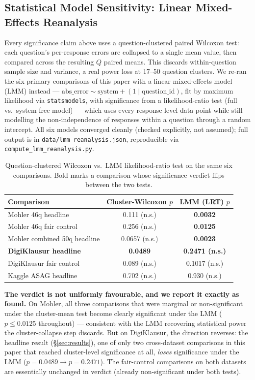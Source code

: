 \documentclass[conference]{IEEEtran}
\begin{document}
\subsection{Statistical Model Sensitivity: Linear Mixed-Effects Reanalysis}
\label{subsec:lmm}

Every significance claim above uses a question-clustered paired Wilcoxon
test: each question's per-response errors are collapsed to a single mean
value, then compared across the resulting $Q$ paired means. This discards
within-question sample size and variance, a real power loss at
$17$--$50$ question clusters. We re-ran the six primary comparisons of this
paper with a linear mixed-effects model (LMM) instead --- $\mathrm{abs\_error}
\sim \mathrm{system} + (1 \mid \mathrm{question\_id})$, fit by maximum
likelihood via \texttt{statsmodels}, with significance from a likelihood-ratio
test (full vs.\ system-free model) --- which uses every response-level data
point while still modelling the non-independence of responses within a
question through a random intercept. All six models converged cleanly
(checked explicitly, not assumed); full output is in
\texttt{data/lmm\_reanalysis.json}, reproducible via
\texttt{compute\_lmm\_reanalysis.py}.

\begin{table}[t]
\centering
\caption{Question-clustered Wilcoxon vs.\ LMM likelihood-ratio test on the
same six comparisons. Bold marks a comparison whose significance verdict
flips between the two tests.}
\label{tab:lmm}
\small
\begin{tabular}{lcc}
\toprule
\textbf{Comparison} & \textbf{Cluster-Wilcoxon $p$} & \textbf{LMM (LRT) $p$} \\
\midrule
Mohler 46q headline & 0.111 (n.s.) & \textbf{0.0032} \\
Mohler 46q fair control & 0.256 (n.s.) & \textbf{0.0125} \\
Mohler combined 50q headline & 0.0657 (n.s.) & \textbf{0.0023} \\
\textbf{DigiKlausur headline} & \textbf{0.0489} & \textbf{0.2471 (n.s.)} \\
DigiKlausur fair control & 0.089 (n.s.) & 0.1017 (n.s.) \\
Kaggle ASAG headline & 0.702 (n.s.) & 0.930 (n.s.) \\
\bottomrule
\end{tabular}
\end{table}

\textbf{The verdict is not uniformly favourable, and we report it exactly
as found.} On Mohler, all three comparisons that were marginal or
non-significant under the cluster-mean test become clearly significant
under the LMM ($p \le 0.0125$ throughout) --- consistent with the LMM
recovering statistical power the cluster-collapse step discards. But on
DigiKlausur, the direction reverses: the headline result
(\S\ref{sec:results}), one of only two cross-dataset comparisons in this
paper that reached cluster-level significance at all, \emph{loses}
significance under the LMM ($p=0.0489 \to p=0.2471$). The fair-control
comparisons on both datasets are essentially unchanged in verdict (already
non-significant under both tests).
\end{document}
